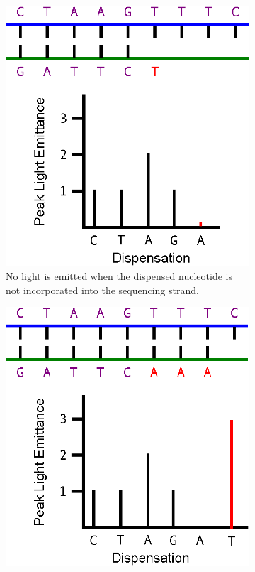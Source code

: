 \documentclass[12pt]{ucthesis}
\begin{document}
      \begin{figure}[t]
         \centering
         \begin{subfigure}[t]{0.45\textwidth}
            \centering
            \includegraphics[width=\textwidth]{graphics/Pyrosequencing_NotIncorporated.eps}
            \caption{No light is emitted when the dispensed nucleotide is not
                     incorporated into the sequencing strand.}
            \label{fig:not_incorporated}
         \end{subfigure}
         \hfill
         \begin{subfigure}[t]{0.45\textwidth}
            \centering
            \includegraphics[width=\textwidth]{graphics/Pyrosequencing_Incorporated.eps}

\end{subfigure}
\end{figure}
\end{document}
